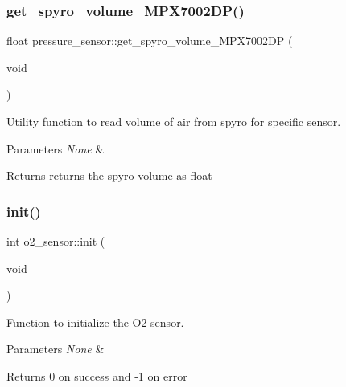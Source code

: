 \subsubsection{\texorpdfstring{get\+\_\+spyro\+\_\+volume\+\_\+\+M\+P\+X7002\+D\+P()}{get\_spyro\_volume\_MPX7002DP()}}
{\footnotesize\ttfamily float pressure\+\_\+sensor\+::get\+\_\+spyro\+\_\+volume\+\_\+\+M\+P\+X7002\+DP (\begin{DoxyParamCaption}\item[{void}]{ }\end{DoxyParamCaption})\hspace{0.3cm}{\ttfamily [protected]}}



Utility function to read volume of air from spyro for specific sensor. 


\begin{DoxyParams}{Parameters}
{\em None} & \\
\hline
\end{DoxyParams}
\begin{DoxyReturn}{Returns}
returns the spyro volume as float 
\end{DoxyReturn}
\mbox{\label{group___ventilator_module_ga913dbc20ebbe78e12f33075d8b0b4b1a}} 
\subsubsection{\texorpdfstring{init()}{init()}\hspace{0.1cm}{\footnotesize\ttfamily [1/2]}}
{\footnotesize\ttfamily int o2\+\_\+sensor\+::init (\begin{DoxyParamCaption}\item[{void}]{ }\end{DoxyParamCaption})\hspace{0.3cm}{\ttfamily [virtual]}}



Function to initialize the O2 sensor. 


\begin{DoxyParams}{Parameters}
{\em None} & \\
\hline
\end{DoxyParams}
\begin{DoxyReturn}{Returns}
0 on success and -\/1 on error 
\end{DoxyReturn}


